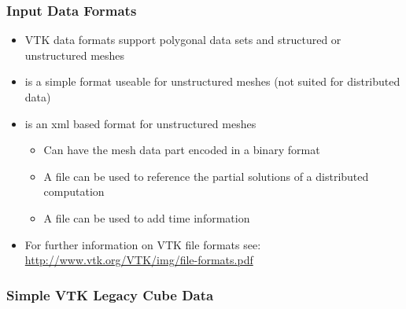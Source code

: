 \begin{frame}

  \frametitle{Input Data Formats}

    \begin{itemize}

      \item VTK data formats support polygonal data sets and structured or unstructured meshes 

      \item {} is a simple format useable for unstructured meshes (not suited for distributed data)  

      \item {} is an xml based format for unstructured meshes   
    \begin{itemize}

      \item Can have the mesh data part encoded in a binary format   

      \item A  file can be used to reference the partial solutions of a distributed computation   

      \item A  file can be used to add time information   

    \end{itemize}

    \item For further information on VTK file formats see:
      \url{http://www.vtk.org/VTK/img/file-formats.pdf}

  \end{itemize}

\end{frame}

\begin{frame}
  \frametitle{Simple VTK Legacy Cube Data}
\end{frame}

